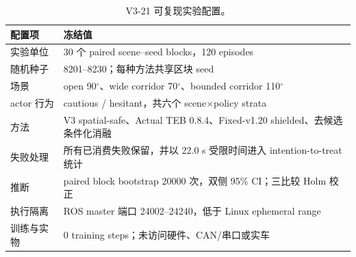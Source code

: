 \begin{table}[htbp]
\centering
\caption{V3-21 可复现实验配置。}
\label{tab:v321-config}
\small
\begin{tabular}{p{}p{}}
\toprule
配置项 & 冻结值\\
\midrule
实验单位 & 30 个 paired scene--seed blocks，120 episodes\\
随机种子 & 8201--8230；每种方法共享区块 seed\\
场景 & open 90$^\circ$、wide corridor 70$^\circ$、bounded corridor 110$^\circ$\\
actor 行为 & cautious / hesitant，共六个 scene$\times$policy strata\\
方法 & V3 spatial-safe、Actual TEB 0.8.4、Fixed-v1.20 shielded、去候选条件化消融\\
失败处理 & 所有已消费失败保留，并以 22.0 s 受限时间进入 intention-to-treat 统计\\
推断 & paired block bootstrap 20000 次，双侧 95\% CI；三比较 Holm 校正\\
执行隔离 & ROS master 端口 24002--24240，低于 Linux ephemeral range\\
训练与实物 & 0 training steps；未访问硬件、CAN/串口或实车\\
\bottomrule
\end{tabular}
\end{table}
